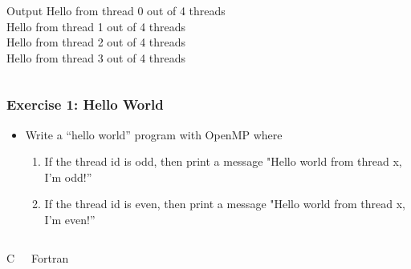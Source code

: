 \documentclass[c,mathserif,compress,xcolor=svgnames]{beamer}
\newenvironment{bblock}[0]
{
\begin{beamerboxesrounded}[upper=uppercol1,lower=lowercol1,shadow=true]}
{\end{beamerboxesrounded}}
\newenvironment{eblock}[0]
{
\begin{beamerboxesrounded}[upper=uppercol2,lower=lowercol2,shadow=true]}
{\end{beamerboxesrounded}}
\begin{document}
\begin{frame}
\begin{columns}
  \end{columns}
  \vspace{0.8cm}
  \begin{columns}
    \column{5cm}
    \begin{eblock}{Output}
      Hello from thread 0 out of 4 threads\\
      Hello from thread 1 out of 4 threads\\
      Hello from thread 2 out of 4 threads\\
      Hello from thread 3 out of 4 threads
    \end{eblock}
  \end{columns}
\end{frame}

\footnotesize

\begin{frame}[fragile]
  \frametitle{\small Exercise 1: Hello World}
  \begin{itemize}
    \item Write a ``hello world'' program with OpenMP where
      \begin{enumerate}
        \item If the thread id is odd, then print a message "Hello world from thread x, I'm odd!''
        \item If the thread id is even, then print a message "Hello world from thread x, I'm even!''
      \end{enumerate}
  \end{itemize}
  \begin{columns}
    \begin{bblock}{C}
      
    \end{bblock}
    \begin{bblock}{Fortran}
      
    \end{bblock}
  \end{columns}
\end{frame}
\end{document}
